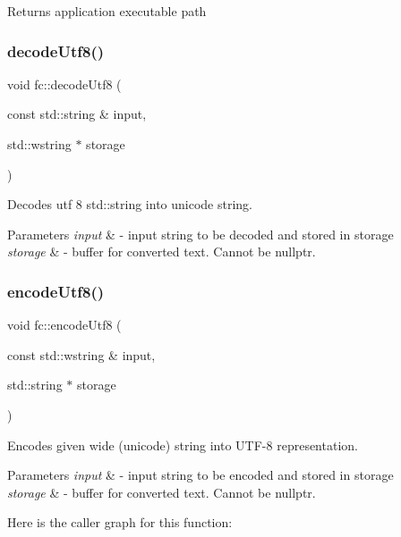 \begin{DoxyReturn}{Returns}
application executable path 
\end{DoxyReturn}
\mbox{\label{namespacefc_a440b80d7907f475f1380eb76f054ed05}} 
\subsubsection{\texorpdfstring{decode\+Utf8()}{decodeUtf8()}}
{\footnotesize\ttfamily void fc\+::decode\+Utf8 (\begin{DoxyParamCaption}\item[{const std\+::string \&}]{input,  }\item[{std\+::wstring $\ast$}]{storage }\end{DoxyParamCaption})}

Decodes utf 8 std\+::string into unicode string. 
\begin{DoxyParams}{Parameters}
{\em input} & -\/ input string to be decoded and stored in \textquotesingle{}storage\textquotesingle{} \\
\hline
{\em storage} & -\/ buffer for converted text. Cannot be nullptr. \\
\hline
\end{DoxyParams}
\mbox{\label{namespacefc_a929646b3a8b7feb5688409ddef1897c9}} 
\subsubsection{\texorpdfstring{encode\+Utf8()}{encodeUtf8()}}
{\footnotesize\ttfamily void fc\+::encode\+Utf8 (\begin{DoxyParamCaption}\item[{const std\+::wstring \&}]{input,  }\item[{std\+::string $\ast$}]{storage }\end{DoxyParamCaption})}

Encodes given wide (unicode) string into U\+T\+F-\/8 representation. 
\begin{DoxyParams}{Parameters}
{\em input} & -\/ input string to be encoded and stored in \textquotesingle{}storage\textquotesingle{} \\
\hline
{\em storage} & -\/ buffer for converted text. Cannot be nullptr. \\
\hline
\end{DoxyParams}
Here is the caller graph for this function\+:
\mbox{\label{namespacefc_a37a488b71b961b892adf844354d23c07}} 
